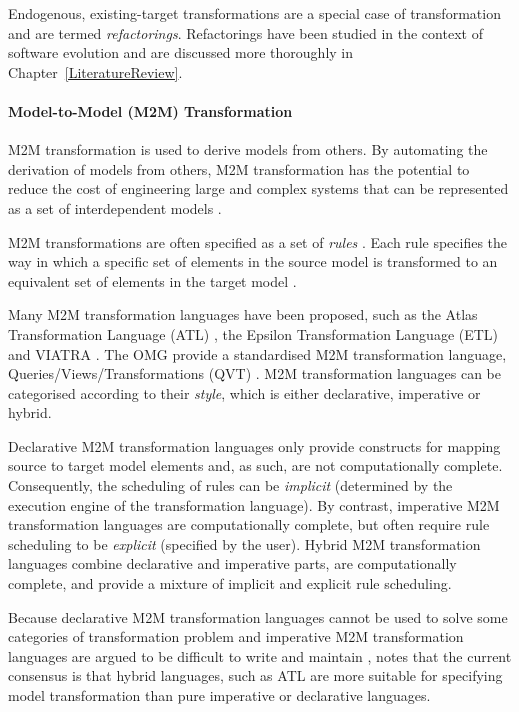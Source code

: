 Endogenous, existing-target transformations are a special case of transformation and are termed \emph{refactorings}. Refactorings have been studied in the context of software evolution and are discussed more thoroughly in Chapter~\ref{LiteratureReview}.


\paragraph{Model-to-Model (M2M) Transformation} M2M transformation is used to derive models from others. By automating the derivation of models from others, M2M transformation has the potential to reduce the cost of engineering large and complex systems that can be represented as a set of interdependent models \cite{sendall03heart}. 

M2M transformations are often specified as a set of \emph{rules} \cite{czarnecki06survey}. Each rule specifies the way in which a specific set of elements in the source model is transformed to an equivalent set of elements in the target model \cite[pg.44]{kolovos09thesis}.

Many M2M transformation languages have been proposed, such as the Atlas Transformation Language (ATL) \cite{jouault05transforming}, the Epsilon Transformation Language (ETL) \cite{kolovos08etl} and VIATRA \cite{viatra}. The OMG \cite{omg} provide a standardised M2M transformation language, Queries/Views/Transformations (QVT) \cite{qvt}. M2M transformation languages can be categorised according to their \emph{style}, which is either declarative, imperative or hybrid.

Declarative M2M transformation languages only provide constructs for mapping source to target model elements and, as such, are not computationally complete. Consequently, the scheduling of rules can be \emph{implicit} (determined by the execution engine of the transformation language). By contrast, imperative M2M transformation languages are computationally complete, but often require rule scheduling to be \emph{explicit} (specified by the user). Hybrid M2M transformation languages combine declarative and imperative parts, are computationally complete, and provide a mixture of implicit and explicit rule scheduling.

Because declarative M2M transformation languages cannot be used to solve some categories of transformation problem \cite{patrascoiu04embedding} and imperative M2M transformation languages are argued to be difficult to write and maintain \cite[pg.45]{kolovos09thesis}, \cite{kolovos08etl} notes that the current consensus is that hybrid languages, such as ATL are more suitable for specifying model transformation than pure imperative or declarative languages.

